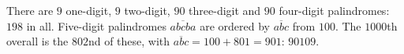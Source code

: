 There are $9$ one-digit, $9$ two-digit, $90$ three-digit and $90$ four-digit palindromes: $198$ in all. Five-digit palindromes $\overline{abcba}$ are ordered by $\overline{abc}$ from $100$. The $1000$th overall is the $802$nd of these, with $\overline{abc}=100+801=901$: $\boxed{90109}$.
